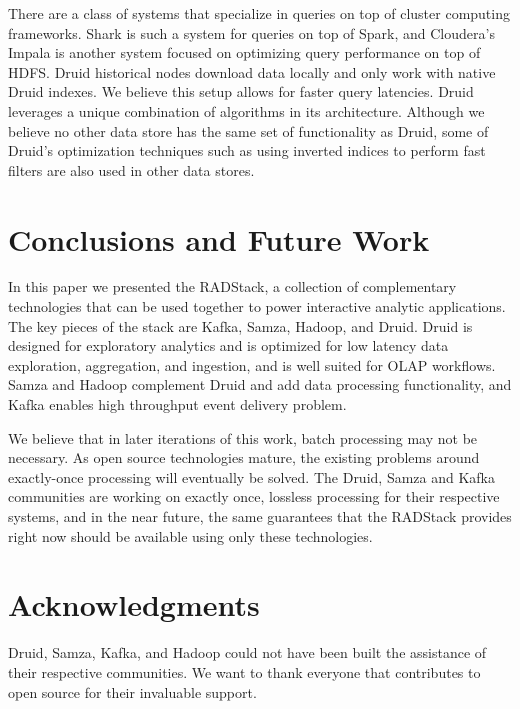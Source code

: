 \documentclass{vldb}
\begin{document}
There are a class of systems that specialize in queries on top of cluster
computing frameworks. Shark\cite{engle2012shark} is such a system for queries
on top of Spark, and Cloudera’s Impala\cite{cloudera2013} is another system
focused on optimizing query performance on top of HDFS. Druid historical nodes
download data locally and only work with native Druid indexes. We believe this
setup allows for faster query latencies. Druid leverages a unique combination
of algorithms in its architecture. Although we believe no other data store has
the same set of functionality as Druid, some of Druid’s optimization techniques
such as using inverted indices to perform fast filters are also used in other
data stores\cite{macnicol2004sybase}. 

\section{Conclusions and Future Work}
\label{sec:conclusions}
In this paper we presented the RADStack, a collection of complementary
technologies that can be used together to power interactive analytic
applications. The key pieces of the stack are Kafka, Samza, Hadoop, and Druid.
Druid is designed for exploratory analytics and is optimized for low latency
data exploration, aggregation, and ingestion, and is well suited for OLAP
workflows. Samza and Hadoop complement Druid and add data processing
functionality, and Kafka enables high throughput event delivery problem. 

We believe that in later iterations of this work, batch processing may not be
necessary. As open source technologies mature, the existing problems around
exactly-once processing will eventually be solved. The Druid, Samza and Kafka
communities are working on exactly once, lossless processing for their
respective systems, and in the near future, the same guarantees that the
RADStack provides right now should be available using only these technologies.


\balance

\section{Acknowledgments}
Druid, Samza, Kafka, and Hadoop could not have been built the assistance of
their respective communities. We want to thank everyone that contributes to
open source for their invaluable support.


\end{document}
